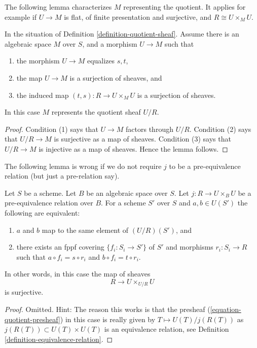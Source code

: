 \medskip\noindent
The following lemma characterizes $M$ representing the quotient.
It applies for example if $U \to M$ is flat,
of finite presentation and surjective, and $R \cong U \times_M U$.

\begin{lemma}
\label{lemma-criterion-quotient-representable}
In the situation of Definition \ref{definition-quotient-sheaf}.
Assume there is an algebraic space $M$ over $S$,
and a morphism $U \to M$ such that
\begin{enumerate}
\item the morphism $U \to M$ equalizes $s, t$,
\item the map $U \to M$ is a surjection of sheaves, and
\item the induced map $(t, s) : R \to U \times_M U$ is a
surjection of sheaves.
\end{enumerate}
In this case $M$ represents the quotient sheaf $U/R$.
\end{lemma}

\begin{proof}
Condition (1) says that $U \to M$ factors through $U/R$.
Condition (2) says that $U/R \to M$ is surjective as a map of sheaves.
Condition (3) says that $U/R \to M$ is injective as a map of sheaves.
Hence the lemma follows.
\end{proof}

\noindent
The following lemma is wrong if we do not require $j$ to be a
pre-equivalence relation (but just a pre-relation say).

\begin{lemma}
\label{lemma-quotient-pre-equivalence}
Let $S$ be a scheme. Let $B$ be an algebraic space over $S$.
Let $j : R \to U \times_B U$ be a pre-equivalence relation over $B$.
For a scheme $S'$ over $S$ and $a, b \in U(S')$ the following are equivalent:
\begin{enumerate}
\item $a$ and $b$ map to the same element of $(U/R)(S')$, and
\item there exists an fppf covering $\{f_i : S_i \to S'\}$ of $S'$
and morphisms $r_i : S_i \to R$ such that
$a \circ f_i = s \circ r_i$ and $b \circ f_i = t \circ r_i$.
\end{enumerate}
In other words, in this case the map of sheaves
$$
R \longrightarrow U \times_{U/R} U
$$
is surjective.
\end{lemma}

\begin{proof}
Omitted. Hint: The reason this works is that the presheaf
(\ref{equation-quotient-presheaf}) in this case is really given
by $T \mapsto U(T)/j(R(T))$ as $j(R(T)) \subset U(T) \times U(T)$
is an equivalence relation, see 
Definition \ref{definition-equivalence-relation}.
\end{proof}


